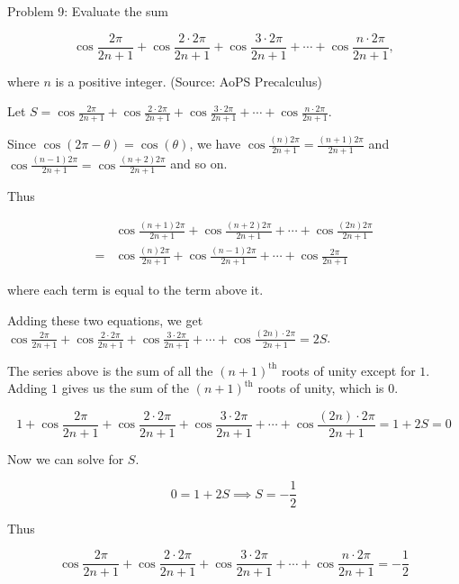Problem 9: Evaluate the sum

\[ \displaystyle \cos \frac{2\pi}{2n+1} + \cos \frac{2\cdot 2\pi}{2n+1} + \cos \frac{3\cdot 2\pi}{2n+1} + \cdots + \cos \frac{n\cdot 2\pi}{2n+1} , \]

where $n$ is a positive integer. (Source: AoPS Precalculus)

Let $\displaystyle S = \cos \frac{2\pi}{2n+1} + \cos \frac{2\cdot 2\pi}{2n+1} + \cos \frac{3\cdot 2\pi}{2n+1} + \cdots + \cos \frac{n\cdot 2\pi}{2n+1}$.

Since $\cos(2\pi - \theta) = \cos(\theta)$, we have $\displaystyle \cos \frac{(n)2\pi}{2n + 1} = \frac{(n+1)2\pi}{2n + 1}$ and $\displaystyle \cos \frac{(n-1)2\pi}{2n + 1} = \cos \frac{(n+2)2\pi}{2n + 1}$ and so on. 

Thus

\begin{align*}
&\cos \frac{(n+1)2\pi}{2n + 1} + \cos \frac{(n+2)2\pi}{2n + 1} + \cdots + \cos \frac{(2n)2\pi}{2n + 1} \\
= &\cos \frac{(n)2\pi}{2n + 1} + \cos \frac{(n-1)2\pi}{2n + 1} + \cdots + \cos \frac{2\pi}{2n + 1}
\end{align*}

where each term is equal to the term above it.

Adding these two equations, we get $\displaystyle \cos \frac{2\pi}{2n+1} + \cos \frac{2\cdot 2\pi}{2n+1} + \cos \frac{3\cdot 2\pi}{2n+1} + \cdots + \cos \frac{(2n) \cdot 2\pi}{2n+1} = 2S$.

The series above is the sum of all the $(n+1)^{\text{th}}$ roots of unity except for $1$. Adding $1$ gives us the sum of the $(n+1)^{\text{th}}$ roots of unity, which is $0$.

$$ 1 + \cos \frac{2\pi}{2n+1} + \cos \frac{2\cdot 2\pi}{2n+1} + \cos \frac{3\cdot 2\pi}{2n+1} + \cdots + \cos \frac{(2n) \cdot 2\pi}{2n+1} = 1 + 2S = 0 $$

Now we can solve for $S$.

$$ 0 = 1 + 2S \implies S = -\frac{1}{2} $$

Thus

$$ \boxed{\cos \frac{2\pi}{2n+1} + \cos \frac{2\cdot 2\pi}{2n+1} + \cos \frac{3\cdot 2\pi}{2n+1} + \cdots + \cos \frac{n\cdot 2\pi}{2n+1} = -\frac{1}{2}} $$
